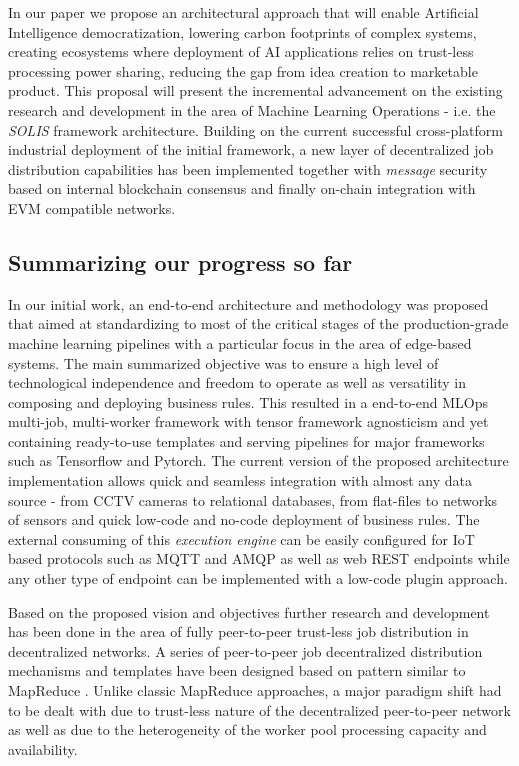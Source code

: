 \documentclass{article}
\begin{document}
In our paper we propose an architectural approach that will enable Artificial Intelligence democratization, lowering carbon footprints of complex systems, creating ecosystems where deployment of AI applications relies on trust-less processing power sharing, reducing the gap from idea creation to marketable product. This proposal will present the incremental advancement on the existing research and development in the area of Machine Learning Operations - i.e. the \emph{SOLIS}\cite{ciobanu2021solis} framework architecture. Building on the current successful cross-platform industrial deployment of the initial framework, a new layer of decentralized job distribution capabilities has been implemented together with \textit{message} security based on internal blockchain consensus and finally on-chain integration with EVM\cite{wood2014ethereum} compatible networks.

\subsection{Summarizing our progress so far}
In our initial work\cite{ciobanu2021solis}, an end-to-end architecture and methodology was proposed that aimed at standardizing to most of the critical stages of the production-grade machine learning pipelines with a particular focus in the area of edge-based systems. The main summarized objective was to ensure a high level of technological independence and freedom to operate as well as versatility in composing and deploying business rules. This resulted in a end-to-end MLOps multi-job, multi-worker framework with tensor framework agnosticism and yet containing ready-to-use templates and serving pipelines for major frameworks such as Tensorflow\cite{abadi2016tensorflow} and Pytorch\cite{paszke2019pytorch}. The current version of the proposed architecture implementation allows quick and seamless integration with almost any data source - from CCTV cameras to relational databases, from flat-files to networks of sensors and  quick low-code and no-code deployment of business rules. The external consuming of this \emph{execution engine} can be easily configured for IoT based protocols such as MQTT\cite{hunkeler2008mqtt}\cite{mqtt} and AMQP\cite{amqp} as well as web REST endpoints while any other type of endpoint can be implemented with a low-code plugin approach.

Based on the proposed vision and objectives further research and development has been done in the area of fully peer-to-peer trust-less job distribution in decentralized networks. A series of peer-to-peer job decentralized distribution mechanisms and templates have been designed based on pattern similar to MapReduce \cite{dean2008mapreduce}. Unlike classic MapReduce approaches, a major paradigm shift had to be dealt with due to trust-less nature of the decentralized peer-to-peer network as well as due to the heterogeneity of the worker pool processing capacity and availability.
\end{document}
